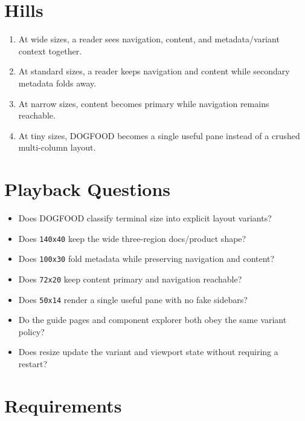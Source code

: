 \section{Hills}\label{record-108-hills}

\begin{enumerate}
\def\labelenumi{\arabic{enumi}.}
\tightlist
\item
  At wide sizes, a reader sees navigation, content, and metadata/variant context together.
\item
  At standard sizes, a reader keeps navigation and content while secondary metadata folds away.
\item
  At narrow sizes, content becomes primary while navigation remains reachable.
\item
  At tiny sizes, DOGFOOD becomes a single useful pane instead of a crushed multi-column layout.
\end{enumerate}

\section{Playback Questions}\label{record-108-playback-questions}

\begin{itemize}
\tightlist
\item
  Does DOGFOOD classify terminal size into explicit layout variants?
\item
  Does \texttt{1\allowbreak{}4\allowbreak{}0\allowbreak{}x\allowbreak{}4\allowbreak{}0} keep the wide three-region docs/product shape?
\item
  Does \texttt{1\allowbreak{}0\allowbreak{}0\allowbreak{}x\allowbreak{}3\allowbreak{}0} fold metadata while preserving navigation and content?
\item
  Does \texttt{7\allowbreak{}2\allowbreak{}x\allowbreak{}2\allowbreak{}0} keep content primary and navigation reachable?
\item
  Does \texttt{5\allowbreak{}0\allowbreak{}x\allowbreak{}1\allowbreak{}4} render a single useful pane with no fake sidebars?
\item
  Do the guide pages and component explorer both obey the same variant policy?
\item
  Does resize update the variant and viewport state without requiring a restart?
\end{itemize}

\section{Requirements}\label{record-108-requirements}

